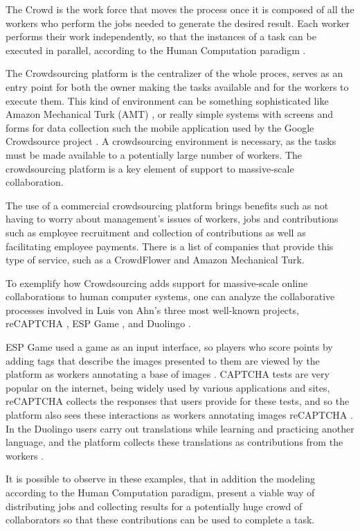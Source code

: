 The Crowd is the work force that moves the process once it is composed of all the workers who perform the jobs needed to generate the desired result. Each worker performs their work independently, so that the instances of a task can be executed in parallel, according to the Human Computation paradigm \cite{Rohwer:2010:NHC:1837885.1837897}.

The Crowdsourcing platform is the centralizer of the whole proces, serves as an entry point for both the owner making the tasks available and for the workers to execute them. This kind of environment can be something sophisticated like Amazon Mechanical Turk (AMT) \cite{Difallah:2015:DMC:2736277.2741685}, or really simple systems with screens and forms for data collection such the mobile application used by the Google Crowdsource project \cite{google_cs}. A crowdsourcing environment is necessary, as the tasks must be made available to a potentially large number of workers. The crowdsourcing platform is a key element of support to massive-scale collaboration.

The use of a commercial crowdsourcing platform brings benefits such as not having to worry about management's issues of workers, jobs and contributions such as employee recruitment and collection of contributions as well as facilitating employee payments. There is a list of companies that provide this type of service, such as a CrowdFlower and Amazon Mechanical Turk.

To exemplify how Crowdsourcing adds support for massive-scale online collaborations to human computer systems, one can analyze the collaborative processes involved in Luis von Ahn's three most well-known projects,  reCAPTCHA \cite{Simmons:2010:PLV:1869086.1869102},  ESP Game \cite{Robertson:2009:REG:1520340.1520597}, and  Duolingo \cite{vonAhn:2011:THC}.


ESP Game used a game as an input interface, so players who score points by adding tags that describe the images presented to them are viewed by the platform as workers annotating a base of images \cite{Robertson:2009:REG:1520340.1520597}. CAPTCHA tests are very popular on the internet, being widely used by various applications and sites, reCAPTCHA collects the responses that users provide for these tests, and so the platform also sees these interactions as workers annotating images reCAPTCHA \cite{Simmons:2010:PLV:1869086.1869102}. In the Duolingo users carry out translations while learning and practicing another language, and the platform collects these translations as contributions from the workers \cite{Abaunza:2016:BRW:3012430.3012522}.


It is possible to observe in these examples, that in addition the modeling according to the Human Computation paradigm, present a viable way of distributing jobs and collecting results for a potentially huge crowd of collaborators so that these contributions can be used to complete a task.




